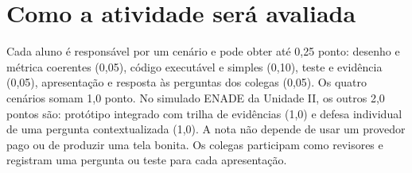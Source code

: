 \documentclass[10pt,a4paper]{article}
\begin{document}
\section*{Como a atividade será avaliada}
Cada aluno é responsável por um cenário e pode obter até 0,25 ponto: desenho e métrica coerentes (0,05), código executável e simples (0,10), teste e evidência (0,05), apresentação e resposta às perguntas dos colegas (0,05). Os quatro cenários somam 1,0 ponto. No simulado ENADE da Unidade II, os outros 2,0 pontos são: protótipo integrado com trilha de evidências (1,0) e defesa individual de uma pergunta contextualizada (1,0). A nota não depende de usar um provedor pago ou de produzir uma tela bonita. Os colegas participam como revisores e registram uma pergunta ou teste para cada apresentação.
\end{document}
